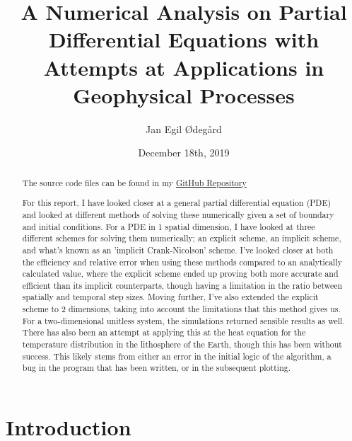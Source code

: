 \documentclass[reprint,english,notitlepage]{revtex4-1}  %
\begin{document}
\title{A Numerical Analysis on Partial Differential Equations with Attempts at Applications in Geophysical Processes}   %
\author{Jan Egil Ødegård} %
\date{December 18th, 2019}                             %
\noaffiliation                            %
\begin{abstract} %
\begin{center}
The source code files can be found in my \href{https://github.com/Jan-Egil/FYS3150}{GitHub Repository}
\end{center}

For this report, I have looked closer at a general partial differential equation (PDE) and looked at different methods of solving these numerically given a set of boundary and initial conditions. For a PDE in 1 spatial dimension, I have looked at three different schemes for solving them numerically; an explicit scheme, an implicit scheme, and what's known as an 'implicit Crank-Nicolson' scheme. I've looked closer at both the efficiency and relative error when using these methods compared to an analytically calculated value, where the explicit scheme ended up proving both more accurate and efficient than its implicit counterparts, though having a limitation in the ratio between spatially and temporal step sizes. Moving further, I've also extended the explicit scheme to 2 dimensions, taking into account the limitations that this method gives us. For a two-dimensional unitless system, the simulations returned sensible results as well. There has also been an attempt at applying this at the heat equation for the temperature distribution in the lithosphere of the Earth, though this has been without success. This likely stems from either an error in the initial logic of the algorithm, a bug in the program that has been written, or in the subsequent plotting.

\end{abstract}                            %
\maketitle                                %


\section{Introduction}
\end{document}
